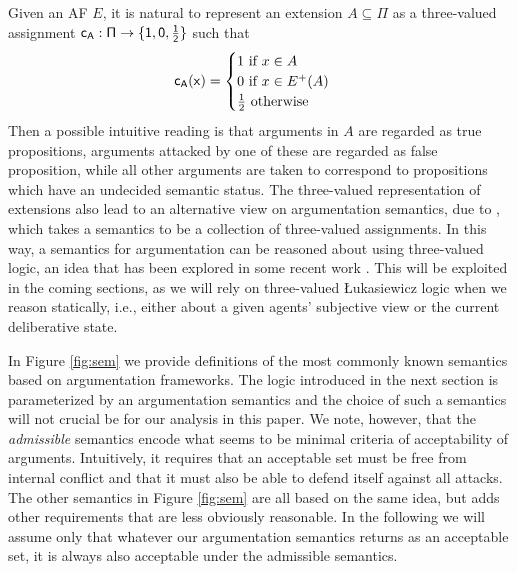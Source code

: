 \documentclass{article}
\newcommand{\outa}[2]{#1^+(#2)}
\newcommand{\clab}{\sf c}
\begin{document}
Given an AF $E$, it is natural to represent an extension $A \subseteq \Pi$ as a three-valued assignment $\clab_A:\Pi \to \three$ such that 
$$
\clab_A(x) = \begin{cases} 1 \text{ if } x \in A \\ 0 \text{ if } x \in \outa E A \\ \frac{1}{2} \text{ otherwise } \end{cases}
$$
Then a possible intuitive reading is that arguments in $A$ are regarded as true propositions, arguments attacked by one of these are regarded as false proposition, while all other arguments are taken to correspond to propositions which have an undecided semantic status. The three-valued representation of extensions also lead to an alternative view on argumentation semantics, due to \cite{camlab}, which takes a semantics to be a collection of three-valued assignments. In this way, a semantics for argumentation can be reasoned about using three-valued logic, an idea that has been explored in some recent work \cite{usSynthese,meESSLLI,Arieli}. This will be exploited in the coming sections, as we will rely on three-valued {\L}ukasiewicz logic when we reason statically, i.e., either about a given agents' subjective view or the current deliberative state.

In Figure \ref{fig:sem} we provide definitions of the most commonly known semantics based on argumentation frameworks. The logic introduced in the next section is parameterized by an argumentation semantics and the choice of such a semantics will not crucial be for our analysis in this paper. We note, however, that the \emph{admissible} semantics encode what seems to be minimal criteria of acceptability of arguments. Intuitively, it requires that an acceptable set must be free from internal conflict and that it must also be able to defend itself against all attacks. The other semantics in Figure \ref{fig:sem} are all based on the same idea, but adds other requirements that are less obviously reasonable. In the following we will assume only that whatever our argumentation semantics returns as an acceptable set, it is always also acceptable under the admissible semantics.
\end{document}
